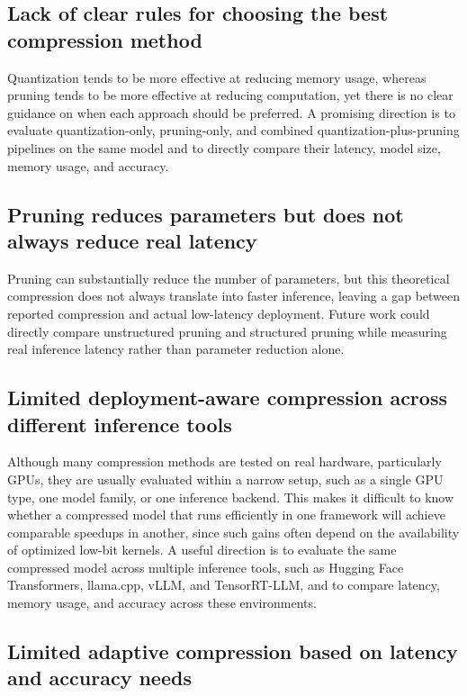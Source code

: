 \subsection{Lack of clear rules for choosing the best compression method}

Quantization tends to be more effective at reducing memory usage, whereas pruning tends to be more effective at reducing computation, yet there is no clear guidance on when each approach should be preferred. A promising direction is to evaluate quantization-only, pruning-only, and combined quantization-plus-pruning pipelines \cite{xu2026daypq} on the same model and to directly compare their latency, model size, memory usage, and accuracy.

\subsection{Pruning reduces parameters but does not always reduce real latency}

Pruning can substantially reduce the number of parameters, but this theoretical compression does not always translate into faster inference, leaving a gap between reported compression and actual low-latency deployment. Future work could directly compare unstructured pruning \cite{frantar2023sparsegpt,sun2024wanda} and structured pruning \cite{ashkboos2024slicegpt,men2024shortgpt} while measuring real inference latency rather than parameter reduction alone.

\subsection{Limited deployment-aware compression across different inference tools}

Although many compression methods are tested on real hardware, particularly GPUs, they are usually evaluated within a narrow setup, such as a single GPU type, one model family, or one inference backend. This makes it difficult to know whether a compressed model that runs efficiently in one framework will achieve comparable speedups in another, since such gains often depend on the availability of optimized low-bit kernels. A useful direction is to evaluate the same compressed model across multiple inference tools, such as Hugging Face Transformers, llama.cpp, vLLM, and TensorRT-LLM, and to compare latency, memory usage, and accuracy across these environments.

\subsection{Limited adaptive compression based on latency and accuracy needs}

